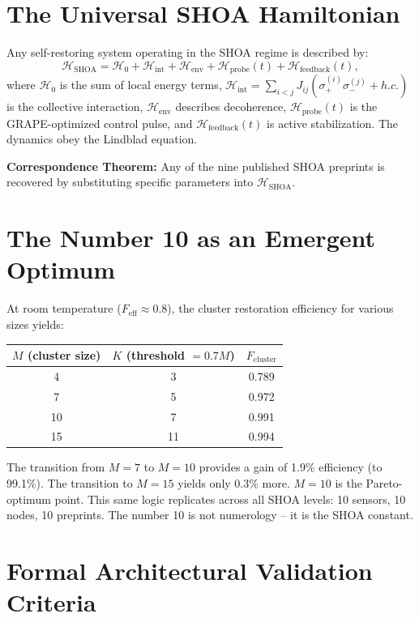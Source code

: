 \documentclass[12pt]{article}
\begin{document}
\section{The Universal SHOA Hamiltonian}
Any self-restoring system operating in the SHOA regime is described by:
\begin{equation}
\mathcal{H}_{\text{SHOA}} = \mathcal{H}_0 + \mathcal{H}_{\text{int}} + \mathcal{H}_{\text{env}} + \mathcal{H}_{\text{probe}}(t) + \mathcal{H}_{\text{feedback}}(t),
\end{equation}
where $\mathcal{H}_0$ is the sum of local energy terms, $\mathcal{H}_{\text{int}} = \sum_{i<j} J_{ij} (\sigma_+^{(i)} \sigma_-^{(j)} + h.c.)$ is the collective interaction, $\mathcal{H}_{\text{env}}$ describes decoherence, $\mathcal{H}_{\text{probe}}(t)$ is the GRAPE-optimized control pulse, and $\mathcal{H}_{\text{feedback}}(t)$ is active stabilization. The dynamics obey the Lindblad equation.

\textbf{Correspondence Theorem:} Any of the nine published SHOA preprints is recovered by substituting specific parameters into $\mathcal{H}_{\text{SHOA}}$.

\section{The Number 10 as an Emergent Optimum}
At room temperature ($F_{\text{eff}} \approx 0.8$), the cluster restoration efficiency for various sizes yields:
\begin{table}[h]
\centering
\begin{tabular}{c|c|c}
$M$ (cluster size) & $K$ (threshold $=0.7M$) & $F_{\text{cluster}}$ \\
\hline
4 & 3 & 0.789 \\
7 & 5 & 0.972 \\
10 & 7 & 0.991 \\
15 & 11 & 0.994
\end{tabular}
\end{table}

The transition from $M=7$ to $M=10$ provides a gain of 1.9\% efficiency (to 99.1\%). The transition to $M=15$ yields only 0.3\% more. $M=10$ is the Pareto-optimum point. This same logic replicates across all SHOA levels: 10 sensors, 10 nodes, 10 preprints. The number 10 is not numerology -- it is the SHOA constant.

\section{Formal Architectural Validation Criteria}
\end{document}
